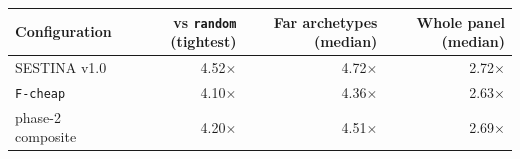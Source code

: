 \begin{tabular}{lrrr}
\toprule
Configuration & vs \texttt{random} (tightest) & Far archetypes (median) & Whole panel (median) \\
\midrule
SESTINA v1.0 & 4.52$\times$ & 4.72$\times$ & 2.72$\times$ \\
\texttt{F-cheap} & 4.10$\times$ & 4.36$\times$ & 2.63$\times$ \\
phase-2 composite & 4.20$\times$ & 4.51$\times$ & 2.69$\times$ \\
\bottomrule
\end{tabular}
